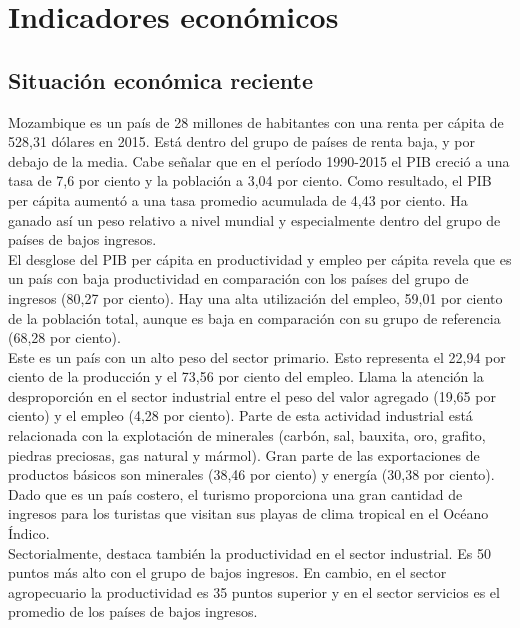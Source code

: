 
\section{Indicadores económicos}

    \subsection{Situación económica reciente}
    Mozambique es un país de 28 millones de habitantes con una renta per cápita de 528,31 dólares en 2015. Está dentro del grupo de países de renta baja, y por debajo de la media. Cabe señalar que en el período 1990-2015 el PIB creció a una tasa de 7,6 por ciento y la población a 3,04 por ciento. Como resultado, el PIB per cápita aumentó a una tasa promedio acumulada de 4,43 por ciento. Ha ganado así un peso relativo a nivel mundial y especialmente dentro del grupo de países de bajos ingresos.\\
    El desglose del PIB per cápita en productividad y empleo per cápita revela que es un país con baja productividad en comparación con los países del grupo de ingresos (80,27 por ciento). Hay una alta utilización del empleo, 59,01 por ciento de la población total, aunque es baja en comparación con su grupo de referencia (68,28 por ciento).\\
    Este es un país con un alto peso del sector primario. Esto representa el 22,94 por ciento de la producción y el 73,56 por ciento del empleo. Llama la atención la desproporción en el sector industrial entre el peso del valor agregado (19,65 por ciento) y el empleo (4,28 por ciento). Parte de esta actividad industrial está relacionada con la explotación de minerales (carbón, sal, bauxita, oro, grafito, piedras preciosas, gas natural y mármol). Gran parte de las exportaciones de productos básicos son minerales (38,46 por ciento) y energía (30,38 por ciento). Dado que es un país costero, el turismo proporciona una gran cantidad de ingresos para los turistas que visitan sus playas de clima tropical en el Océano Índico.\\
    Sectorialmente, destaca también la productividad en el sector industrial. Es 50 puntos más alto con el grupo de bajos ingresos. En cambio, en el sector agropecuario la productividad es 35 puntos superior y en el sector servicios es el promedio de los países de bajos ingresos.\\

